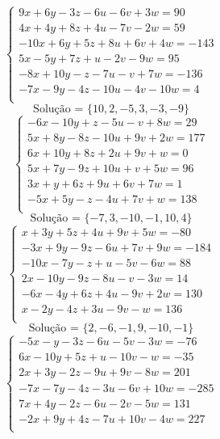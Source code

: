 \documentclass[12pt,oneside,a4paper]{article}
\begin{document}
\vspace{\baselineskip}
\begin{equation*}
\begin{cases}
9x+6y-3z-6u-6v+3w=90 \\
4x+4y+8z+4u-7v-2w=59 \\
-10x+6y+5z+8u+6v+4w=-143 \\
5x-5y+7z+u-2v-9w=95 \\
-8x+10y-z-7u-v+7w=-136 \\
-7x-9y-4z-10u-4v-10w=4 \\
\end{cases}
\end{equation*}
\begin{equation*}
\text{Solução = }\{10,2,-5,3,-3,-9\}
\end{equation*}
\vspace{\baselineskip}
\begin{equation*}
\begin{cases}
-6x-10y+z-5u-v+8w=29 \\
5x+8y-8z-10u+9v+2w=177 \\
6x+10y+8z+2u+9v+w=0 \\
5x+7y-9z+10u+v+5w=96 \\
3x+y+6z+9u+6v+7w=1 \\
-5x+5y-z-4u+7v+w=138 \\
\end{cases}
\end{equation*}
\begin{equation*}
\text{Solução = }\{-7,3,-10,-1,10,4\}
\end{equation*}
\vspace{\baselineskip}
\begin{equation*}
\begin{cases}
x+3y+5z+4u+9v+5w=-80 \\
-3x+9y-9z-6u+7v+9w=-184 \\
-10x-7y-z+u-5v-6w=88 \\
2x-10y-9z-8u-v-3w=14 \\
-6x-4y+6z+4u-9v+2w=130 \\
x-2y-4z+3u-9v-w=136 \\
\end{cases}
\end{equation*}
\begin{equation*}
\text{Solução = }\{2,-6,-1,9,-10,-1\}
\end{equation*}
\vspace{\baselineskip}
\begin{equation*}
\begin{cases}
-5x-y-3z-6u-5v-3w=-76 \\
6x-10y+5z+u-10v-w=-35 \\
2x+3y-2z-9u+9v-8w=201 \\
-7x-7y-4z-3u-6v+10w=-285 \\
7x+4y-2z-6u-2v-5w=131 \\
-2x+9y+4z-7u+10v-4w=227 \\
\end{cases}
\end{equation*}
\end{document}
